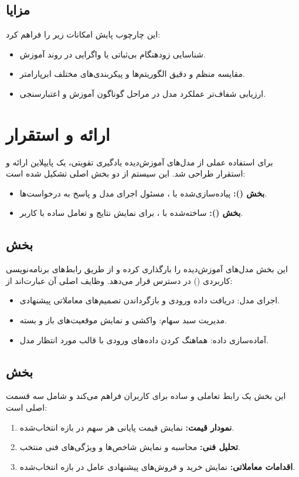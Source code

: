 \documentclass[12pt, a4paper]{report}
\begin{document}
\subsection{مزایا}
این چارچوب پایش امکانات زیر را فراهم کرد:
\begin{itemize}
    \item شناسایی زودهنگام بی‌ثباتی یا واگرایی در روند آموزش.  
    \item مقایسه منظم و دقیق الگوریتم‌ها و پیکربندی‌های مختلف ابرپارامتر.  
    \item ارزیابی شفاف‌تر عملکرد مدل در مراحل گوناگون آموزش و اعتبارسنجی.  
\end{itemize}


\section{ارائه و استقرار}
\label{sec:deployment}

برای استفاده عملی از مدل‌های آموزش‌دیده یادگیری تقویتی، یک پایپلاین ارائه و استقرار طراحی شد.  
این سیستم از دو بخش اصلی تشکیل شده است:  
\begin{itemize}
    \item \textbf{بخش  ():} پیاده‌سازی‌شده با ، مسئول اجرای مدل و پاسخ به درخواست‌ها.  
    \item \textbf{بخش  ():} ساخته‌شده با ، برای نمایش نتایج و تعامل ساده با کاربر.  
\end{itemize}

\subsection{بخش }
این بخش مدل‌های آموزش‌دیده را بارگذاری کرده و از طریق رابط‌های برنامه‌نویسی کاربردی () در دسترس قرار می‌دهد.  
وظایف اصلی آن عبارت‌اند از:
\begin{itemize}
    \item اجرای مدل: دریافت داده ورودی و بازگرداندن تصمیم‌های معاملاتی پیشنهادی.  
    \item مدیریت سبد سهام: واکشی و نمایش موقعیت‌های باز و بسته.  
    \item آماده‌سازی داده: هماهنگ کردن داده‌های ورودی با قالب مورد انتظار مدل.  
\end{itemize}

\subsection{بخش }
این بخش یک رابط تعاملی و ساده برای کاربران فراهم می‌کند و شامل سه قسمت اصلی است:
\begin{enumerate}
    \item \textbf{نمودار قیمت:} نمایش قیمت پایانی هر سهم در بازه انتخاب‌شده.  
    \item \textbf{تحلیل فنی:} محاسبه و نمایش شاخص‌ها و ویژگی‌های فنی منتخب.  
    \item \textbf{اقدامات معاملاتی:} نمایش خرید و فروش‌های پیشنهادی عامل در بازه انتخاب‌شده.  
\end{enumerate}
\end{document}
